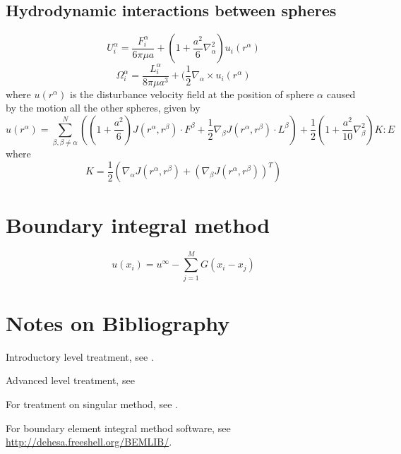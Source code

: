 \begin{refsection}
\subsection{Hydrodynamic interactions between spheres}
\begin{lemma}\cite{durlofsky1987dynamic}
	$$U_i^\alpha = \frac{F_i^\alpha}{6\pi\mu a} + (1 + \frac{a^2}{6}\nabla^2_{\alpha})u_i(r^\alpha)$$
	$$\Omega_i^\alpha = \frac{L_i^\alpha}{8\pi\mu a^3} + (\frac{1}{2}\nabla_{\alpha}\times u_i(r^\alpha)$$
where $u(r^\alpha)$ is the disturbance velocity field at the position of sphere $\alpha$ caused by the motion all the other spheres, given by
$$u(r^\alpha) = \sum_{\beta,\beta\neq \alpha}^{N}((1+\frac{a^2}{6})J(r^\alpha,r^\beta)\cdot F^\beta + \frac{1}{2}\nabla_\beta J(r^\alpha,r^\beta)\cdot L^\beta) + \frac{1}{2}(1 + \frac{a^2}{10}\nabla^2_\beta)K:E$$
where
$$K = \frac{1}{2}(\nabla_\alpha J(r^\alpha,r^\beta) + (\nabla_\beta J(r^\alpha,r^\beta))^T)$$
\end{lemma}

\section{Boundary integral method}
\begin{lemma}\cite[81]{guazzelli2011physical}
	
	
	$$u(x_i)  = u^\infty - \sum_{j=1}^M G(x_i-x_j)$$
\end{lemma}


\section{Notes on Bibliography}


Introductory level treatment, see \cite{guazzelli2011physical}.

Advanced level treatment, see \cite{kim2013microhydrodynamics}

For treatment on singular method, see \cite{pozrikidis1992boundary}.

For boundary element integral method software, see \href{link}{http://dehesa.freeshell.org/BEMLIB/}\cite{pozrikidis2002practical}.

\printbibliography
\end{refsection}
